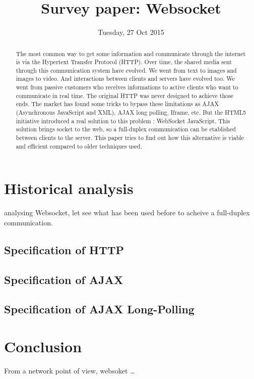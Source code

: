 \documentclass[9pt,journal,compsoc]{IEEEtran}
\begin{document}
\author{}

\title{Survey paper: Websocket}

\date{Tuesday, 27 Oct 2015}

\maketitle
\IEEEpeerreviewmaketitle



\begin{abstract}
The most common way to get some information and communicate through the internet is via the Hypertext Transfer Protocol (HTTP). Over time, the shared media sent through this communication system have evolved. We went from text to images and images to video. And interactions between clients and servers have evolved too. We went from passive customers who receives informations to active clients who want to communicate in real time. The original HTTP was never designed to achieve those ends. The market has found some tricks to bypass these limitations as AJAX (Asynchronous JavaScript and XML), AJAX long polling, Iframe, etc. But the HTML5 initiative introduced a real solution to this problem : WebSocket JavaScript. This solution brings socket to the web, so a full-duplex communication can be etablished between clients to the server. This paper tries to find out how this alternative is viable and efficient compared to older techniques used. \cite{http-rfc}
\end{abstract}

\section{Historical analysis}



 analysing Websocket, let see what has been used before to acheive a full-duplex communication.

\subsection{Specification of HTTP}

\subsection{Specification of AJAX}

\subsection{Specification of AJAX Long-Polling}

\section{Conclusion}

From a network point of view, websoket …


\ifCLASSOPTIONcaptionsoff
  \newpage
\fi




\end{document}
